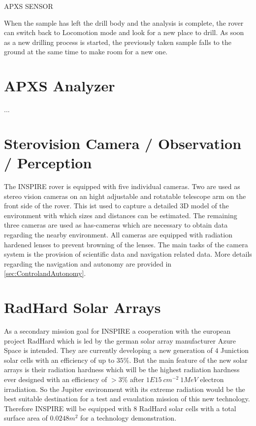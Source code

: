 APXS SENSOR

When the sample has left the drill body and the analysis is complete, the rover can switch back to Locomotion mode and look for a new place to drill. As soon as a new drilling process is started, the previously taken sample falls to the ground at the same time to make room for a new one.

\section{APXS Analyzer}

...

\section{Sterovision Camera / Observation / Perception}

The INSPIRE rover is equipped with five individual cameras. Two are used as stereo vision cameras on an hight adjustable and rotatable telescope arm on the front side of the rover. This ist used to capture a detailed 3D model of the environment with which sizes and distances can be estimated. The remaining three cameras are used as has-cameras which are necessary to obtain data regarding the nearby environment. All cameras are equipped with radiation hardened lenses to prevent browning of the lenses. The main tasks of the camera system is the provision of scientific data and navigation related data. More details regarding the navigation and autonomy are provided in \autoref{sec:ControlandAutonomy}.

\section{RadHard Solar Arrays}
\label{subsec:radhard}
As a secondary mission goal for INSPIRE a cooperation with the european project RadHard which is led by the german solar array manufacturer Azure Space is intended. They are currently developing a new generation of $4$ Juniction solar cells with an efficiency of up to $35 \% $. But the main feature of the new solar arrays is their radiation hardness which will be the highest radiation hardness ever designed with an efficiency of $>3 \% $ after $1E15 \ cm^{-2} \ 1MeV$ electron irradiation. So the Jupiter environment with its extreme radiation would be the best suitable destination for a test and evaulation mission of this new technology. Therefore INSPIRE will be equipped with $8$ RadHard solar cells with a total surface area of $0.0248 m^2$ for a technology demonstration\cite{FraunhoferInstituteforSolarEnergySystemsISE.2021}.

